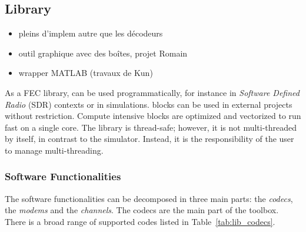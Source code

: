 \subsection{Library}

\begin{itemize}
  \item pleins d'implem autre que les décodeurs
  \item outil graphique avec des boîtes, projet Romain
  \item wrapper MATLAB (travaux de Kun)
\end{itemize}

As a FEC library, \AFFECT can be used programmatically, for instance in
\emph{Software Defined Radio} (SDR) contexts or in simulations. \AFFECT blocks
can be used in external projects without restriction. Compute intensive blocks
are optimized and vectorized to run fast on a single core. The library is
thread-safe; however, it is not multi-threaded by itself, in contrast to the
simulator. Instead, it is the responsibility of the user to manage
multi-threading.

\subsubsection{Software Functionalities}

The \AFFECT software functionalities can be decomposed in three main parts: the
\textit{codecs}, the \textit{modems} and the \textit{channels}. The codecs are
the main part of the toolbox. There is a broad range of supported codes listed
in Table~\ref{tab:lib_codecs}.

